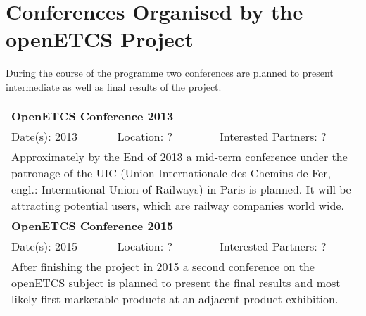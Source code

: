 ﻿\section{Conferences Organised by the openETCS Project}

During the course of the programme two conferences are planned to present intermediate as well as final results of the project.

\renewcommand{\tableentry}[5]{\multicolumn{3}{|l|}{\textbf{#1}}\\Date(s): #2&Location: #3&Interested Partners: #4\\\multicolumn{3}{|p{\textwidth}|}{#5}\\\hline}

\begin{longtable}{|lll|}
 \hline
 \tableentry{OpenETCS Conference 2013}{2013}{?}{?}{
	Approximately by the End of 2013 a mid-term conference under the patronage of the UIC (Union Internationale des Chemins de Fer, engl.: International Union of Railways) in Paris is planned. It will be attracting potential users, which are railway companies world wide.
 }
 \tableentry{OpenETCS Conference 2015}{2015}{?}{?}{
	After finishing the project in 2015 a second conference on the openETCS subject is planned to present the final results and most likely first marketable products at an adjacent product exhibition.
 }
\end{longtable}
